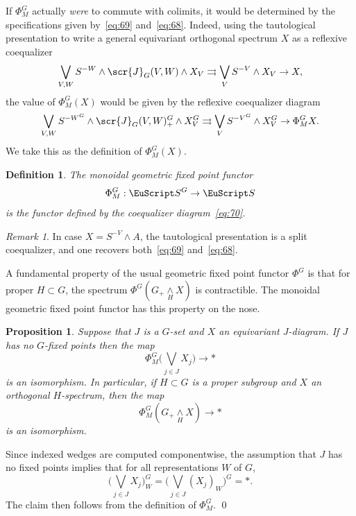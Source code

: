 \documentclass{amsart}
\newtheorem{prop}[equation]{Proposition}
\newtheorem{definition}[equation]{Definition}
\newenvironment{defin}{\begin{definition}\rm}{\end{definition}}
\newtheorem{rem}[equation]{Remark}
\theoremstyle{definition}
\newtheorem{defin}[equation]{Definition}
\theoremstyle{remark}
\newtheorem{rem}[equation]{Remark}
\newenvironment{pf}{\bigskip{\em Proof:\/}}{\qed\medskip}
\newcommand{\spectra}{\EuScript S}
\newcommand{\smashove}[1]{\underset{#1}{\wedge}}
\newcommand{\gfp}[1]{\Phi^{#1}}
\newcommand{\gfpm}[1]{\Phi_{M}^{#1}}
\newcommand{\phig}{\gfp{G}}
\newcommand{\phigm}{\gfpm{G}}
\newcommand{\icat}{\scr{J}}
\newcommand{\igcat}[1]{\icat_{#1}}
\newcommand{\ugspectra}[1]{\spectra^{#1}}
\newcommand{\fixg}[1]{#1^{G}}
\begin{document}
If $\phigm$ actually {\em were} to commute with colimits, it would be
determined by the specifications given by~\eqref{eq:69}
and~\eqref{eq:68}.  Indeed, using the tautological presentation to write
a general equivariant orthogonal spectrum $X$ as a reflexive
coequalizer
\[
\bigvee_{V,W} S^{-W}\wedge\igcat G(V,W)\wedge
X_{V}\rightrightarrows \bigvee_{V} S^{-V}\wedge X_{V} \to X,
\]
the value of $\phigm(X)$ would be given by the reflexive coequalizer diagram
\begin{equation}
\label{eq:70}
\bigvee_{V,W} S^{-\fixg{W}}\wedge\igcat G(V,W)^{G}_{+}\wedge
X_{V}^{G}\rightrightarrows \bigvee_{V} S^{-\fixg{V}}\wedge X_{V}^{G} \to
\phigm X.  
\end{equation}
We take this as the definition of $\phigm(X)$.  


\begin{defin}
\label{def:3}
The {\em monoidal geometric fixed point functor} 
\[
\phigm:\ugspectra{G} \to \spectra
\]
is the functor defined by the coequalizer diagram~\eqref{eq:70}.
\end{defin}

\begin{rem}
\label{rem:13}
In case $X=S^{-V}\wedge A$, the tautological presentation is a split
coequalizer, and one recovers both~\eqref{eq:69} and~\eqref{eq:68}.
\end{rem}

A fundamental property of the usual geometric fixed point functor
$\phig$ is that for proper $H\subset G$, the spectrum
$\phig(G_{+}\smashove{H}X)$ is contractible.  The monoidal geometric
fixed point functor has this property on the nose.

\begin{prop}
\label{thm:73}
Suppose that $J$ is a $G$-set and $X$ an equivariant $J$-diagram.   If
$J$ has no $G$-fixed points then the map 
\[
\phigm\big(\bigvee_{j\in J}X_{j}) \to \ast
\]
is an isomorphism.  In particular, if $H\subset G$ is a proper
subgroup and $X$ an orthogonal $H$-spectrum, then the map
\[
\phigm(G_{+}\smashove{H}X) \to \ast
\]
is an isomorphism.
\end{prop}

\begin{pf}
Since indexed wedges are computed componentwise, the assumption that
$J$ has no fixed points implies that for all representations $W$
of $G$,
\[
\big(\bigvee_{j\in J}X_{j}\big)_{W}^{G} = \big(\bigvee_{j\in
J}(X_{j})_{W}\big)^{G} = \ast.
\]
The claim then follows from the definition of $\phigm$.
\end{pf}
\end{document}

